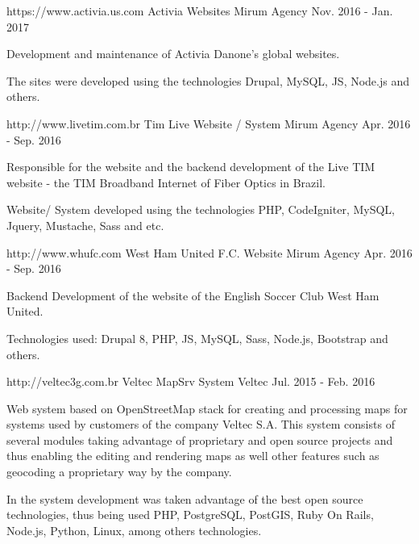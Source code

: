 \begin{cventries}
  \cventry
    {https://www.activia.us.com} %
    {Activia Websites} %
    {Mirum Agency} %
    {Nov. 2016 - Jan. 2017} %
    {
      \begin{cvitems} %
        \item {Development and maintenance of Activia Danone's global websites.}
        \item {The sites were developed using the technologies Drupal, MySQL, JS, Node.js and others.}
      \end{cvitems}
    }


  \cventry
    {http://www.livetim.com.br} %
    {Tim Live Website / System} %
    {Mirum Agency} %
    {Apr. 2016 - Sep. 2016} %
    {
      \begin{cvitems} %
        \item {Responsible for the website and the backend development of the Live TIM website - the TIM Broadband Internet of Fiber Optics in Brazil.}
        \item {Website/ System developed using the technologies PHP, CodeIgniter, MySQL, Jquery, Mustache, Sass and etc.}
      \end{cvitems}
    }


 \cventry
    {http://www.whufc.com} %
    {West Ham United F.C. Website} %
    {Mirum Agency} %
    {Apr. 2016 - Sep. 2016} %
    {
      \begin{cvitems} %
        \item {Backend Development of the website of the English Soccer Club West Ham United.}
         \item { Technologies used: Drupal 8, PHP, JS, MySQL, Sass, Node.js, Bootstrap and others.}
      \end{cvitems}
    }


 \cventry
    {http://veltec3g.com.br} %
    {Veltec MapSrv System} %
    {Veltec} %
    {Jul. 2015 - Feb. 2016} %
    {
      \begin{cvitems} %
        \item {Web system based on OpenStreetMap stack for creating and processing maps for systems used by customers of the company Veltec S.A. This system consists of several modules taking advantage of proprietary and open source projects and thus enabling the editing and rendering maps as well other features such as geocoding a proprietary way by the company.}
         \item {In the system development was taken advantage of the best open source technologies, thus being used PHP, PostgreSQL, PostGIS, Ruby On Rails, Node.js, Python, Linux, among others technologies.}
      \end{cvitems}
    }

\end{cventries}
